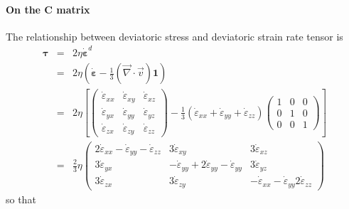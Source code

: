 \paragraph{On the ${\bm C}$ matrix}

The relationship between deviatoric stress and deviatoric strain rate tensor is 
\begin{eqnarray}
\bm \tau 
&=& 2 \eta \dot{\bm \varepsilon}^d \\
&=& 2 \eta \left( \dot{\bm \varepsilon} -\frac{1}{3}(\vec\nabla\cdot\vec v) {\bm 1} \right) \\
&=& 2 \eta
\left[ 
\left(
\begin{array}{ccc}
\dot\varepsilon_{xx} & \dot\varepsilon_{xy} & \dot\varepsilon_{xz} \\ 
\dot\varepsilon_{yx} & \dot\varepsilon_{yy} & \dot\varepsilon_{yz} \\ 
\dot\varepsilon_{zx} & \dot\varepsilon_{zy} & \dot\varepsilon_{zz} 
\end{array}
\right)
-
\frac{1}{3}
(\dot\varepsilon_{xx} + \dot\varepsilon_{yy} +  \dot\varepsilon_{zz})
\left(
\begin{array}{ccc}
1 &0 &0 \\
0 &1 &0\\ 
0 &0 &1 
\end{array}
\right)
\right] \\
&=& \frac{2}{3} \eta
\left(
\begin{array}{ccc}
2\dot\varepsilon_{xx} -\dot\varepsilon_{yy} -\dot\varepsilon_{zz} & 
3\dot\varepsilon_{xy} &
3\dot\varepsilon_{xz} \\ 
3\dot\varepsilon_{yx} & 
-\dot\varepsilon_{yy} +2\dot\varepsilon_{yy} -\dot\varepsilon_{yy} & 
3\dot\varepsilon_{yz} \\ 
3\dot\varepsilon_{zx} & 
3\dot\varepsilon_{zy} & 
-\dot\varepsilon_{xx} -\dot\varepsilon_{yy} 2\dot\varepsilon_{zz}  
\end{array}
\right)
\end{eqnarray}
so that 
